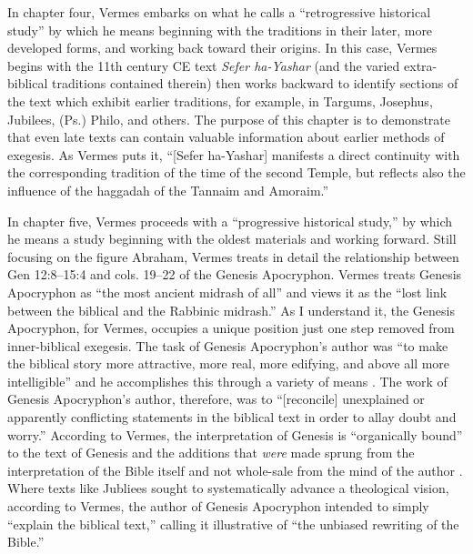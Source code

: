 In chapter four, Vermes embarks on what he calls a ``retrogressive
historical study'' by which he means beginning with the traditions in
their later, more developed forms, and working back toward their
origins. In this case, Vermes begins with the 11th century CE text
\emph{Sefer ha-Yashar} (and the varied extra-biblical traditions
contained therein) then works backward to identify sections of the text
which exhibit earlier traditions, for example, in Targums, Josephus,
Jubilees, (Ps.) Philo, and others. The purpose of this chapter is to
demonstrate that even late texts can contain valuable information about
earlier methods of exegesis. As Vermes puts it, ``{[}Sefer ha-Yashar{]}
manifests a direct continuity with the corresponding tradition of the
time of the second Temple, but reflects also the influence of the
haggadah of the Tannaim and Amoraim.''\autocite[95]{vermes1961}

In chapter five, Vermes proceeds with a ``progressive historical
study,'' by which he means a study beginning with the oldest materials
and working forward. Still focusing on the figure Abraham, Vermes treats
in detail the relationship between Gen 12:8--15:4 and cols. 19--22 of
the Genesis Apocryphon. Vermes treats Genesis Apocryphon as ``the most
ancient midrash of all''\autocite[124]{vermes1961} and views it as the
``lost link between the biblical and the Rabbinic midrash.''
\autocite[124]{vermes1961} As I understand it, the Genesis Apocryphon,
for Vermes, occupies a unique position just one step removed from
inner-biblical exegesis. The task of Genesis Apocryphon's author was
``to make the biblical story more attractive, more real, more edifying,
and above all more intelligible'' and he accomplishes this through a
variety of means \autocite[125]{vermes1961}. The work of
Genesis Apocryphon's author, therefore, was to ``{[}reconcile{]}
unexplained or apparently conflicting statements in the biblical text in
order to allay doubt and worry.''\autocite[125]{vermes1961} According to
Vermes, the interpretation of Genesis is ``organically bound'' to the
text of Genesis and the additions that \emph{were} made sprung from the
interpretation of the Bible itself and not whole-sale from the mind of
the author \autocite[126]{vermes1961}. Where texts like Jubliees sought
to systematically advance a theological vision, according to Vermes, the
author of Genesis Apocryphon intended to simply ``explain the biblical
text,'' calling it illustrative of ``the unbiased rewriting of the
Bible.''\autocite[126]{vermes1961}

